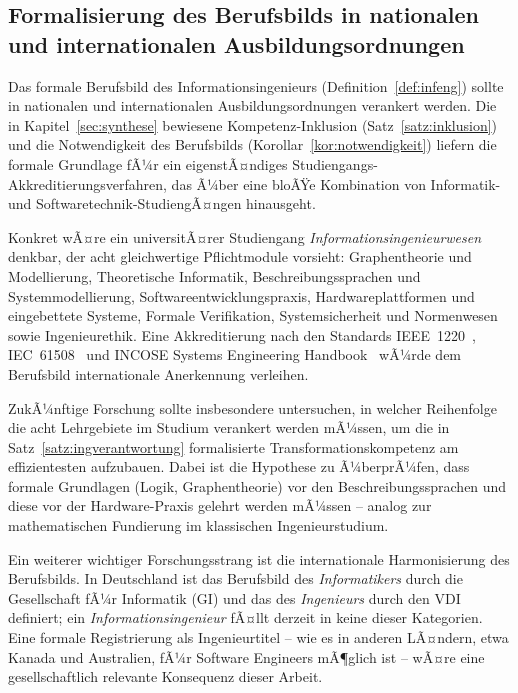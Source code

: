 ﻿\documentclass[a4paper,12pt]{article}
\theoremstyle{definition}
\begin{document}
\subsection{Formalisierung des Berufsbilds in nationalen und internationalen Ausbildungsordnungen}

Das formale Berufsbild des Informationsingenieurs (Definition~\ref{def:infeng}) sollte
in nationalen und internationalen Ausbildungsordnungen verankert werden. Die in Kapitel~\ref{sec:synthese}
bewiesene Kompetenz-Inklusion (Satz~\ref{satz:inklusion}) und die Notwendigkeit des Berufsbilds
(Korollar~\ref{kor:notwendigkeit}) liefern die formale Grundlage fÃ¼r ein eigenstÃ¤ndiges
Studiengangs-Akkreditierungsverfahren, das Ã¼ber eine bloÃŸe Kombination von Informatik-
und Softwaretechnik-StudiengÃ¤ngen hinausgeht.

Konkret wÃ¤re ein universitÃ¤rer Studiengang \emph{Informationsingenieurwesen} denkbar,
der acht gleichwertige Pflichtmodule vorsieht: Graphentheorie und Modellierung,
Theoretische Informatik, Beschreibungssprachen und Systemmodellierung,
Softwareentwicklungspraxis, Hardwareplattformen und eingebettete Systeme,
Formale Verifikation, Systemsicherheit und Normenwesen sowie Ingenieurethik.
Eine Akkreditierung nach den Standards IEEE~1220~\cite{ieee2021}, IEC~61508~\cite{iec61508}
und INCOSE Systems Engineering Handbook~\cite{incose2015} wÃ¼rde dem Berufsbild
internationale Anerkennung verleihen.

ZukÃ¼nftige Forschung sollte insbesondere untersuchen, in welcher Reihenfolge die acht
Lehrgebiete im Studium verankert werden mÃ¼ssen, um die in Satz~\ref{satz:ingverantwortung}
formalisierte Transformationskompetenz am effizientesten aufzubauen. Dabei ist die
Hypothese zu Ã¼berprÃ¼fen, dass formale Grundlagen (Logik, Graphentheorie) vor den
Beschreibungssprachen und diese vor der Hardware-Praxis gelehrt werden mÃ¼ssen --
analog zur mathematischen Fundierung im klassischen Ingenieurstudium.

Ein weiterer wichtiger Forschungsstrang ist die internationale Harmonisierung des
Berufsbilds. In Deutschland ist das Berufsbild des \emph{Informatikers} durch die
Gesellschaft fÃ¼r Informatik (GI) und das des \emph{Ingenieurs} durch den VDI
definiert; ein \emph{Informationsingenieur} fÃ¤llt derzeit in keine dieser Kategorien.
Eine formale Registrierung als Ingenieurtitel -- wie es in anderen LÃ¤ndern, etwa
Kanada und Australien, fÃ¼r Software Engineers mÃ¶glich ist -- wÃ¤re eine gesellschaftlich
relevante Konsequenz dieser Arbeit.
\end{document}
